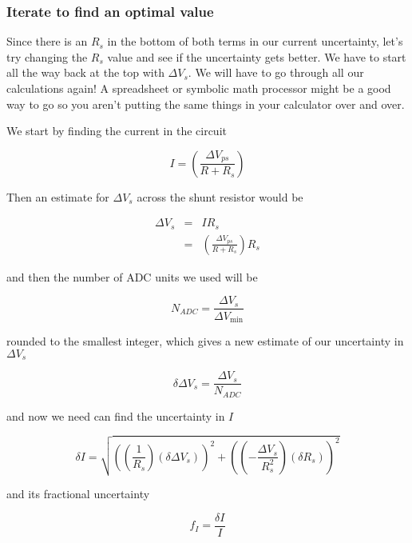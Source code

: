 \subsubsection{Iterate to find an optimal value}

Since there is an $R_{s}$ in the bottom of both terms in our current uncertainty, let's try changing the $R_{s}$ value and see if the uncertainty gets better. We have to start all the way back at the top with $\Delta V_{s}. $ We will have to go through all our calculations again! A
spreadsheet or symbolic math processor might be a good way to go so you aren't putting the same things in your calculator over and over.

We start by finding the current in the circuit

\begin{equation*}
	I=\left( \frac{\Delta V_{ps}}{R+R_{s}}\right)
\end{equation*}

\noindent Then an estimate for $\Delta V_{s}$ across the shunt resistor would be

\begin{eqnarray*}
	\Delta V_{s} &=&IR_{s} \\ &=&\left( \frac{\Delta V_{ps}}{R+R_{s}}\right) R_{s}
\end{eqnarray*}

\noindent and then the number of ADC units we used will be 

\begin{equation*}
	N_{ADC}=\frac{\Delta V_{s}}{\Delta V_{\min }}
\end{equation*}

\noindent rounded to the smallest integer, which gives a new estimate of our uncertainty in $\Delta V_{s}$ 

\begin{equation*}
	\delta \Delta V_{s}=\frac{\Delta V_{s}}{N_{ADC}}
\end{equation*}

\noindent and now we need can find the uncertainty in $I$

\begin{equation*}
	\delta I=\sqrt{\left( \left( \frac{1}{R_{s}}\right) \left( \delta \Delta V_{s}\right) \right) ^{2}+\left( \left( -\frac{\Delta V_{s}}{R_{s}^{2}} \right) \left( \delta R_{s}\right) \right) ^{2}}
\end{equation*}

\noindent and its fractional uncertainty

\begin{equation*}
	f_{I}=\frac{\delta I}{I}
\end{equation*}

